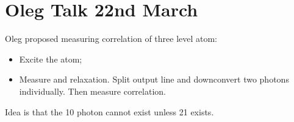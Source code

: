  \section{Oleg Talk 22nd March}
  Oleg proposed measuring correlation of three level atom:
  \begin{itemize}
  	\item Excite the atom;
  	\item Measure \ra{} and \ra{} relaxation. Split output line and downconvert two photons individually. Then measure correlation.
  \end{itemize}

 Idea is that the 10 photon cannot exist unless 21 exists.
\newpage
